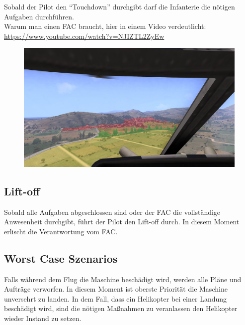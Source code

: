 Sobald der Pilot den “Touchdown” durchgibt darf die Infanterie die nötigen Aufgaben 
durchführen.\\
Warum man einen FAC braucht, hier in einem Video verdeutlicht:\\
\url{https://www.youtube.com/watch?v=NJIZTL2ZyEw}

	\begin{figure}[htbp]
		\centering
		\includegraphics[width=0.95\linewidth]{../img/advanced/hubschrauber_+_infanterie/sicht-pilot}
	\end{figure}

\subsection{Lift-off}
Sobald alle Aufgaben abgeschlossen sind oder der FAC die vollständige Anwesenheit 
durchgibt, führt der Pilot den Lift-off durch. In diesem Moment erlischt die Verantwortung 
vom FAC. 

\subsection{Worst Case Szenarios}
Falls während dem Flug die Maschine beschädigt wird, werden alle Pläne und Aufträge 
verworfen. In diesem Moment ist oberste Priorität die Maschine unversehrt zu landen. In  
dem Fall, dass ein Helikopter bei einer Landung beschädigt wird, sind die nötigen  
Maßnahmen zu veranlassen den Helikopter wieder Instand zu setzen.